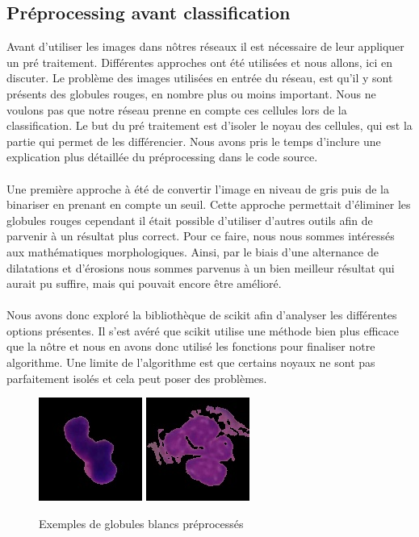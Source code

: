 \subsection{Préprocessing avant classification}
Avant d'utiliser les images dans nôtres réseaux il est nécessaire de leur appliquer un pré traitement. Différentes approches ont été utilisées et nous allons, ici en discuter. Le problème des images utilisées en entrée du réseau, est qu’il y sont présents des globules rouges, en nombre plus ou moins important. Nous ne voulons pas que notre réseau prenne en compte ces cellules lors de la classification. Le but du pré traitement est d'isoler le noyau des cellules, qui est la partie qui permet de les différencier. Nous avons pris le temps d'inclure une explication plus détaillée du préprocessing dans le code source.
\paragraph{}
Une première approche à été de convertir l'image en niveau de gris puis de la binariser en prenant en compte un seuil. Cette approche permettait d’éliminer les globules rouges cependant il était possible d’utiliser d’autres outils afin de parvenir à un résultat plus correct. Pour ce faire, nous nous sommes intéressés aux mathématiques morphologiques. Ainsi, par le biais d’une alternance de dilatations et d’érosions nous sommes parvenus à un bien meilleur résultat qui aurait pu suffire, mais qui pouvait encore être amélioré.

\paragraph{}
Nous avons donc exploré la bibliothèque de scikit afin d’analyser les différentes options présentes. Il s’est avéré que scikit utilise une méthode bien plus efficace que la nôtre et nous en avons donc utilisé les fonctions pour finaliser notre algorithme. Une limite de l’algorithme est que certains noyaux ne sont pas parfaitement isolés et cela peut poser des problèmes.

\begin{figure}[!h]
    \centering
    \includegraphics[scale=0.75]{images/globule cutter.jpg}
    \includegraphics[scale=0.75]{images/globule cutter 2.jpg}
    \caption{Exemples de globules blancs préprocessés}
    \label{fig:wbc-preprocessed}
\end{figure}

